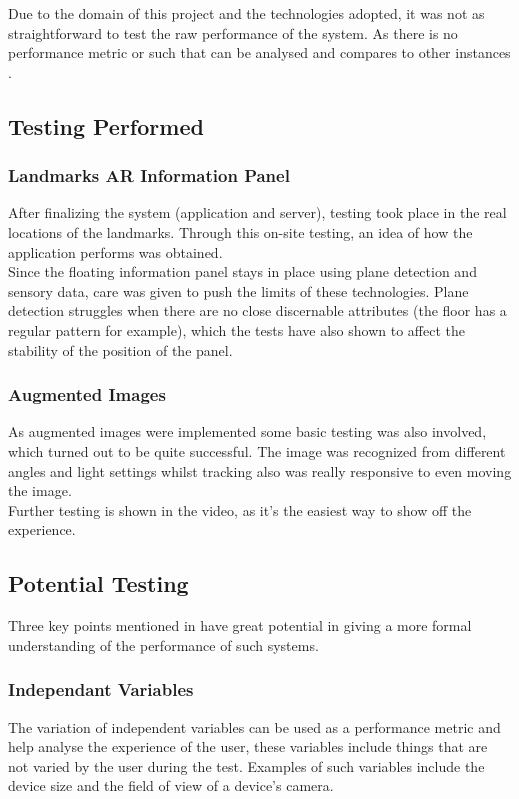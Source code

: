 Due to the domain of this project and the technologies adopted, it was not as straightforward to 
test the raw performance of the system. As there is no performance metric or such that can be 
analysed and compares to other instances \cite{Samini2017}. 
\subsection{Testing Performed}

\subsubsection{Landmarks AR Information Panel}
After finalizing the system (application and server), testing took place in the 
real locations of the landmarks. Through this on-site testing, an idea of how the application 
performs was obtained.\\
Since the floating information panel stays in place using plane detection and sensory data, care 
was given to push the limits of these technologies. Plane detection struggles when there are 
no close discernable attributes (the floor has a regular pattern for example), which the tests 
have also shown to affect the stability of the position of the panel. 
\subsubsection{Augmented Images}
As augmented images were implemented some basic testing was also involved, 
which turned out to be quite successful. The image was recognized from different angles and 
light settings whilst tracking also was really responsive to even moving the image.  
\\
Further testing is shown in the video, as it's the easiest way to show off the experience.
\subsection{Potential Testing}
Three key points mentioned in \cite{Samini2017} have great potential in giving a more formal understanding of the performance of such systems. 
\subsubsection{Independant Variables}
The variation of independent variables can be used as a performance metric and help analyse 
the experience of the user, these variables include things that are not varied by the user during 
the test. Examples of such variables include the device size and the field of view of a device's 
camera.\\
